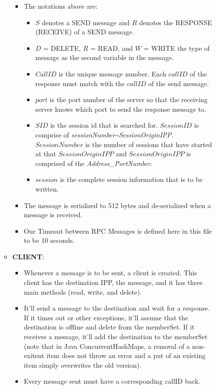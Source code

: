 \documentclass{article}
\begin{document}
\begin{description}
\begin{itemize}
\begin{itemize}
\begin{itemize}
                \item The notations above are:
                  \begin{itemize}
                    \item $S$ denotes a SEND message and $R$ denotes the RESPONSE (RECEIVE) of a SEND message.
                    \item $D$ = DELETE, $R$ = READ, and $W$ = WRITE the type of message as the second variable in the message.
                    \item $CallID$ is the unique message number. Each $callID$ of the response must match with the $callID$ of the send message.
                    \item $port$ is the port number of the server so that the receiving server knows which port to send the response message to.
                    \item $SID$ is the session id that is searched for. $SessionID$ is comprise of \emph{sessionNumber\textasciitilde{}SessionOriginIPP}. $SessionNumber$ is the number of sessions that have started at that $SessionOriginIPP$ and $SessionOriginIPP$ is comprised of the \emph{Address\_PortNumber}.
                    \item $session$ is the complete session information that is to be written.
                  \end{itemize}
		\item The message is serialized to 512 bytes and de-serialized when a message is received.
		\item Our Timeout between RPC Messages is defined here in this file to be 10 seconds.
              \end{itemize}
            \item \textbf{CLIENT}:
              \begin{itemize} 
                \item Whenever a message is to be sent, a client is created. This client has the destination IPP, the message, and it has three main methods (read, write, and delete). 
                \item It'll send a message to the destination and wait for a response. If it times out or other exceptions, it'll assume that the destination is offline and delete from the memberSet. If it receives a message, it'll add the destination to the memberSet (note that in Java ConcurrentHashMaps, a removal of a non-exitent item does not throw an error and a put of an existing item simply overwrites the old version). 
                \item Every message sent must have a corresponding callID back.

\end{itemize}
\end{itemize}
\end{itemize}
\end{description}
\end{document}
